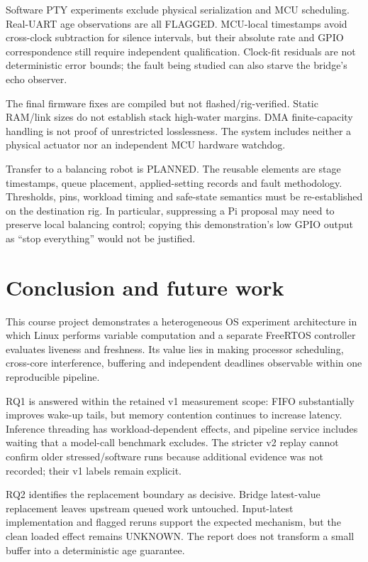 \documentclass[a4paper,11pt]{article}
\newcommand{\page}{\clearpage}
\begin{document}
Software PTY experiments exclude physical serialization and MCU scheduling. Real-UART age observations are all FLAGGED. MCU-local timestamps avoid cross-clock subtraction for silence intervals, but their absolute rate and GPIO correspondence still require independent qualification. Clock-fit residuals are not deterministic error bounds; the fault being studied can also starve the bridge's echo observer.

The final firmware fixes are compiled but not flashed/rig-verified. Static RAM/link sizes do not establish stack high-water margins. DMA finite-capacity handling is not proof of unrestricted losslessness. The system includes neither a physical actuator nor an independent MCU hardware watchdog.

Transfer to a balancing robot is PLANNED. The reusable elements are stage timestamps, queue placement, applied-setting records and fault methodology. Thresholds, pins, workload timing and safe-state semantics must be re-established on the destination rig. In particular, suppressing a Pi proposal may need to preserve local balancing control; copying this demonstration's low GPIO output as ``stop everything'' would not be justified.
\page
\section{Conclusion and future work}
This course project demonstrates a heterogeneous OS experiment architecture in which Linux performs variable computation and a separate FreeRTOS controller evaluates liveness and freshness. Its value lies in making processor scheduling, cross-core interference, buffering and independent deadlines observable within one reproducible pipeline.

RQ1 is answered within the retained v1 measurement scope: FIFO substantially improves wake-up tails, but memory contention continues to increase latency. Inference threading has workload-dependent effects, and pipeline service includes waiting that a model-call benchmark excludes. The stricter v2 replay cannot confirm older stressed/software runs because additional evidence was not recorded; their v1 labels remain explicit.

RQ2 identifies the replacement boundary as decisive. Bridge latest-value replacement leaves upstream queued work untouched. Input-latest implementation and flagged reruns support the expected mechanism, but the clean loaded effect remains UNKNOWN. The report does not transform a small buffer into a deterministic age guarantee.
\end{document}
